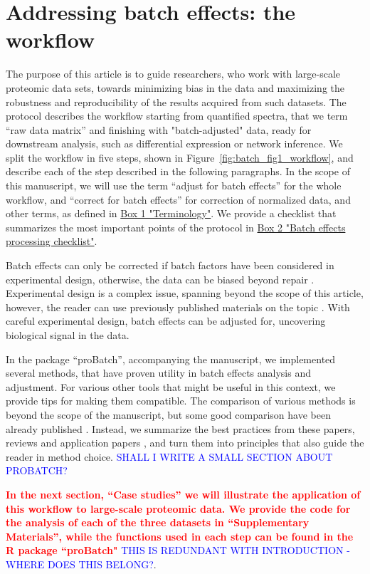 \documentclass[num-refs]{wiley-article}
\begin{document}
\section{Addressing batch effects: the workflow}

The purpose of this article is to guide researchers, who work with large-scale proteomic data sets, towards minimizing bias in the data and maximizing the robustness and reproducibility of the results acquired from such datasets. The protocol describes the workflow starting from quantified spectra, that we term “raw data matrix” and finishing with "batch-adjusted" data, ready for downstream analysis, such as differential expression or network inference. We split the workflow in five steps, shown in Figure~\ref{fig:batch_fig1_workflow}, and describe each of the step described in the following paragraphs. In the scope of this manuscript, we will use the term “adjust for batch effects” for the whole workflow, and “correct for batch effects” for correction of normalized data, and other terms, as defined in  \hyperref[box:Box1_definitions]{Box 1 "Terminology"}. 
We provide a checklist that summarizes the most important points of the protocol in \hyperref[box:Box1_definitions]{Box 2 "Batch effects processing checklist"}.

Batch effects can only be corrected if batch factors have been considered in experimental design, otherwise, the data can be biased beyond repair  \cite{Hu2005, Gilad2015}. Experimental design is a complex issue, spanning beyond the scope of this article, however, the reader can use previously published materials on the topic \cite{Oberg2009, Cuklina2020}. With careful experimental design, batch effects can be adjusted for, uncovering biological signal in the data. 
 
In the package “proBatch”, accompanying the manuscript, we implemented several methods, that have proven utility in batch effects analysis and adjustment. For various other tools that might be useful in this context, we provide tips for making them compatible. The comparison of various methods is beyond the scope of the manuscript, but some good comparison have been already published \cite{Chawade:2014aa, Luo2010}. Instead, we summarize the best practices from these papers, reviews \cite{Lazar:2013aa, Leek:2010aa}  and application papers \cite{Sajic2018, Collins2017}, and turn them into principles that also guide the reader in method choice. 
\textcolor{blue}{SHALL I WRITE A SMALL SECTION ABOUT PROBATCH?}

\textcolor{red}{\textbf{In the next section, “Case studies” we will illustrate the application of this workflow to large-scale proteomic data. We provide the code for the analysis of each of the three datasets in “Supplementary Materials”, while the functions used in each step can be found in the R package “proBatch"}} \textcolor{blue}{THIS IS REDUNDANT WITH INTRODUCTION - WHERE DOES THIS BELONG?}. 
\end{document}
